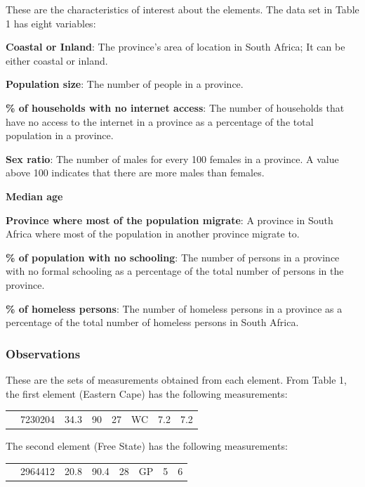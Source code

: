 \documentclass[
]{book}
\begin{document}
These are the characteristics of interest about the elements. The data set in Table 1 has eight variables:

\textbf{Coastal or Inland}: The province's area of location in South Africa; It can be either coastal or inland.

\textbf{Population size}: The number of people in a province.

\textbf{\% of households with no internet access}: The number of households that have no access to the internet in a province as a percentage of the total population in a province.

\textbf{Sex ratio}: The number of males for every 100 females in a province. A value above 100 indicates that there are more males than females.

\textbf{Median age}

\textbf{Province where most of the population migrate}: A province in South Africa where most of the population in another province migrate to.

\textbf{\% of population with no schooling}: The number of persons in a province with no formal schooling as a percentage of the total number of persons in the province.

\textbf{\% of homeless persons}: The number of homeless persons in a province as a percentage of the total number of homeless persons in South Africa.

\subsubsection{Observations}\label{observations}

These are the sets of measurements obtained from each element. From Table 1, the first element (Eastern Cape) has the following measurements:

\begin{longtable}[]{@{}llllllll@{}}
\toprule\noalign{}
\endhead
\bottomrule\noalign{}
\endlastfoot
1 & 7230204 & 34.3 & 90 & 27 & WC & 7.2 & 7.2 \\
\end{longtable}

The second element (Free State) has the following measurements:

\begin{longtable}[]{@{}llllllll@{}}
\toprule\noalign{}
\endhead
\bottomrule\noalign{}
\endlastfoot
2 & 2964412 & 20.8 & 90.4 & 28 & GP & 5 & 6 \\
\end{longtable}
\end{document}
